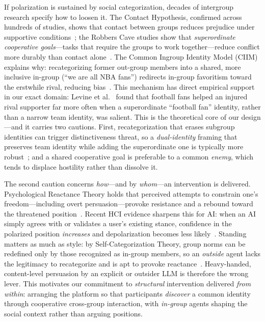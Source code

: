 If polarization is sustained by social categorization, decades of intergroup
research specify how to loosen it. The Contact Hypothesis, confirmed across
hundreds of studies, shows that contact between groups reduces prejudice under
supportive conditions~\cite{pettigrew2006contact}; the Robbers Cave studies show
that \emph{superordinate cooperative goals}---tasks that require the groups to
work together---reduce conflict more durably than contact
alone~\cite{sherif1961robbers}. The Common Ingroup Identity Model (CIIM)
explains why: recategorizing former out-group members into a shared, more
inclusive in-group (``we are all NBA fans'') redirects in-group favoritism
toward the erstwhile rival, reducing bias~\cite{gaertner2000reducing}. This
mechanism has direct empirical support in our exact domain: Levine et
al.~\cite{levine2005identity} found that football fans helped an injured rival
supporter far more often when a superordinate ``football fan'' identity, rather
than a narrow team identity, was salient. This is the theoretical core of our
design---and it carries two cautions. First, recategorization that erases
subgroup identities can trigger distinctiveness threat, so a \emph{dual-identity}
framing that preserves team identity while adding the superordinate one is
typically more robust~\cite{crisp2006recategorization}; and a shared cooperative
goal is preferable to a common \emph{enemy}, which tends to displace hostility
rather than dissolve it.

The second caution concerns \emph{how}---and by \emph{whom}---an intervention is
delivered. Psychological Reactance Theory holds that perceived attempts to constrain
one's freedom---including overt persuasion---provoke resistance and a rebound toward
the threatened position~\cite{brehm1966reactance}. Recent HCI evidence sharpens this
for AI: when an AI simply agrees with or validates a user's existing stance,
confidence in the polarized position \emph{increases} and depolarization becomes
less likely~\cite{whenaiagrees2026}. Standing matters as much as style: by
Self-Categorization Theory, group norms can be redefined only by those recognized as
in-group members, so an \emph{outside} agent lacks the legitimacy to recategorize and
is apt to provoke reactance~\cite{turner1987selfcat}. Heavy-handed, content-level
persuasion by an explicit or outsider LLM is therefore the wrong lever. This
motivates our commitment to \emph{structural} intervention delivered \emph{from
within}: arranging the platform so that participants \emph{discover} a common
identity through cooperative cross-group interaction, with \emph{in-group} agents
shaping the social context rather than arguing positions.


